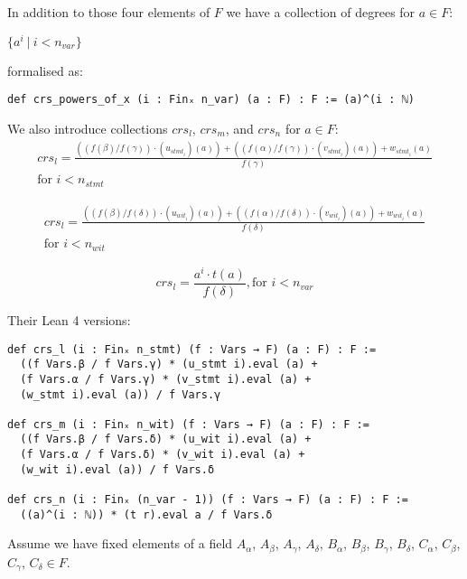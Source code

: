 \documentclass{article}
\theoremstyle{definition}
\theoremstyle{remark}
\begin{document}
In addition to those four elements of $F$ we have a collection of degrees for $a \in F$:
\begin{center}
$\{ a^i \: | \: i < n_{var} \}$
\end{center}
formalised as:
\begin{lstlisting}
def crs_powers_of_x (i : Finₓ n_var) (a : F) : F := (a)^(i : ℕ)
\end{lstlisting}

We also introduce collections $crs_l$, $crs_m$, and $crs_n$ for $a \in F$:
\begin{multline}
crs_l = \frac{((f(\beta) / f(\gamma)) \cdot (u_{{stmt}_i})(a)) + ((f(\alpha) / f(\gamma)) \cdot (v_{{stmt}_i})(a)) + w_{{stmt}_i}(a)}{f(\gamma)} \\ \text{for $i < n_{stmt}$}
\end{multline}

\begin{multline}
crs_l = \frac{((f(\beta) / f(\delta)) \cdot (u_{{wit}_i})(a)) + ((f(\alpha) / f(\delta)) \cdot (v_{{wit}_i})(a)) + w_{{wit}_i}(a)}{f(\delta)} \\ \text{for $i < n_{wit}$}
\end{multline}

\begin{equation}
crs_l = \frac{a^i \cdot t(a)}{f(\delta)}, \text{for $i < n_{var}$}
\end{equation}

Their Lean 4 versions:

\begin{lstlisting}
def crs_l (i : Finₓ n_stmt) (f : Vars → F) (a : F) : F :=
  ((f Vars.β / f Vars.γ) * (u_stmt i).eval (a) +
  (f Vars.α / f Vars.γ) * (v_stmt i).eval (a) +
  (w_stmt i).eval (a)) / f Vars.γ

def crs_m (i : Finₓ n_wit) (f : Vars → F) (a : F) : F :=
  ((f Vars.β / f Vars.δ) * (u_wit i).eval (a) +
  (f Vars.α / f Vars.δ) * (v_wit i).eval (a) +
  (w_wit i).eval (a)) / f Vars.δ

def crs_n (i : Finₓ (n_var - 1)) (f : Vars → F) (a : F) : F :=
  ((a)^(i : ℕ)) * (t r).eval a / f Vars.δ
\end{lstlisting}

Assume we have fixed elements of a field $A_{\alpha}$, $A_{\beta}$, $A_{\gamma}$, $A_{\delta}$, $B_{\alpha}$, $B_{\beta}$, $B_{\gamma}$, $B_{\delta}$, $C_{\alpha}$, $C_{\beta}$, $C_{\gamma}$, $C_{\delta} \in F$.
\end{document}
